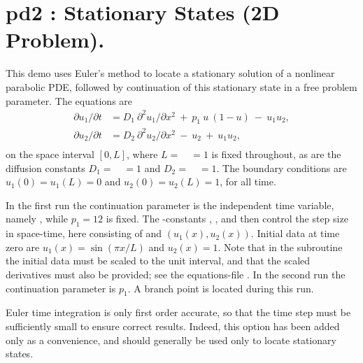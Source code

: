 \documentclass[12pt]{report}
\begin{document}
\newpage
\section{ pd2 : Stationary States (2D Problem).} \label{sec:Demos_pd2}
This demo uses Euler's method to locate a stationary solution of
a nonlinear parabolic PDE, followed by continuation of this stationary
state in a free problem parameter. The equations are
\begin{equation} \begin{array}{cl}
  {\partial u_1 / \partial t} &= D_1~{\partial^2 u_1 / \partial x^2}
  ~+~  p_1~ u ~( 1-u) ~-~ u_1 u_2 , \\
  {\partial u_2 / \partial t} 
  &= D_2~{\partial^2 u_2 / \partial x^2} ~-~ u_2 ~+~ u_1 u_2 , \\
\end{array} \end{equation}
on the space interval $[0,L]$, where $L=$~~$=1$ is fixed throughout,
as are the diffusion constants $D_1=$~~$=1$ and $D_2=$~~$=1$.
The boundary conditions are $u_1(0) = u_1(L) = 0$ and $u_2(0) = u_2(L) = 1$,
for all time.

In the first run the continuation parameter is the independent time variable,
namely , while $p_1=12$ is fixed.
The \AUTO-constants , , and  then control the step size
in space-time, here consisting of  and $(u_1(x),u_2(x))$.
Initial data at time zero are $u_1(x)=\sin(\pi x/L)$ and $u_2(x)=1$.
Note that in the subroutine  the initial data must be scaled to 
the unit interval, and that the scaled derivatives must also be provided; 
see the equations-file .
In the second run the continuation parameter is $p_1$.
A branch point is located during this run.

Euler time integration is only first order accurate, so that
the time step must be sufficiently small to ensure correct results.
Indeed, this option has been added only as a convenience, and should 
generally be used only to locate stationary states.
\end{document}
